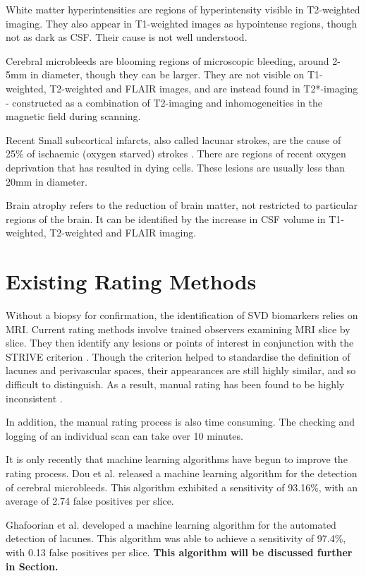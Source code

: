 White matter hyperintensities are regions of hyperintensity visible in T2-weighted imaging. They also appear in T1-weighted images as hypointense regions, though not as dark as CSF. Their cause is not well understood.

Cerebral microbleeds are blooming regions of microscopic bleeding, around 2-5mm in diameter, though they can be larger. They are not visible on T1-weighted, T2-weighted and FLAIR images, and are instead found in T2*-imaging - constructed as a combination of T2-imaging and inhomogeneities in the magnetic field during scanning. 

Recent Small subcortical infarcts, also called lacunar strokes, are the cause of 25\% of ischaemic (oxygen starved) strokes \cite{WardlawJ.M.2013Nsfr}. There are regions of recent oxygen deprivation that has resulted in dying cells. These lesions are usually less than 20mm in diameter. 

Brain atrophy refers to the reduction of brain matter, not restricted to particular regions of the brain. It can be identified by the increase in CSF volume in T1-weighted, T2-weighted and FLAIR imaging.


\section{Existing Rating Methods}\label{svd-rating}

Without a biopsy for confirmation, the identification of SVD biomarkers relies on MRI. Current rating methods involve trained observers examining MRI slice by slice. They then identify any lesions or points of interest in conjunction with the STRIVE criterion \cite{WardlawJ.M.2013Nsfr}. Though the criterion helped to standardise the definition of lacunes and perivascular spaces, their appearances are still highly similar, and so difficult to distinguish. As a result, manual rating has been found to be highly inconsistent \cite{PotterGillian2015CPSV}. 

In addition, the manual rating process is also time consuming. The checking and logging of an individual scan can take over 10 minutes.

It is only recently that machine learning algorithms have begun to improve the rating process. Dou et al. \cite{DouQ.2016ADoC} released a machine learning algorithm for the detection of cerebral microbleeds. This algorithm exhibited a sensitivity of 93.16\%, with an average of 2.74 false positives per slice. 

Ghafoorian et al. \cite{GhafoorianM.2017Dml3} developed a machine learning algorithm for the automated detection of lacunes. This algorithm was able to achieve a sensitivity of 97.4\%, with 0.13 false positives per slice. \textbf{This algorithm will be discussed further in Section.}


